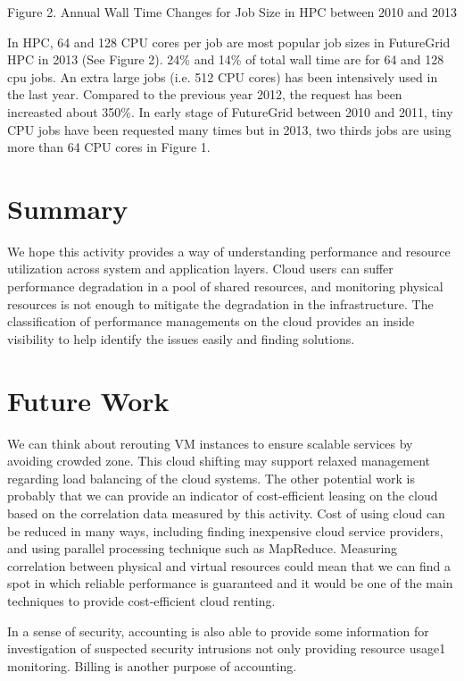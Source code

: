 \documentclass{sig-alternate}
\begin{document}
Figure 2. Annual Wall Time Changes for Job Size in HPC between 2010 and 2013

In HPC, 64 and 128 CPU cores per job are most popular job sizes in FutureGrid HPC in 2013 (See Figure 2). 24\% and 14\% of total wall time are for 64 and 128 cpu jobs. An extra large jobs (i.e. 512 CPU cores) has been intensively used in the last year. Compared to the previous year 2012, the request has been increasted about 350\%. In early stage of FutureGrid between 2010 and 2011, tiny CPU jobs have been requested many times but in 2013, two thirds jobs are using more than 64 CPU cores in Figure 1.
 
\section{Summary}

We hope this activity provides a way of understanding performance and resource utilization across system and application layers. Cloud users can suffer performance degradation in a pool of shared resources, and monitoring physical resources is not enough to mitigate the degradation in the infrastructure. The classification of performance managements on the cloud provides an inside visibility to help identify the issues easily and finding solutions.

\section{Future Work}

We can think about rerouting VM instances to ensure scalable services by avoiding crowded zone. This cloud shifting may support relaxed management regarding load balancing of the cloud systems. The other potential work is probably that we can provide an indicator of cost-efficient leasing on the cloud based on the correlation data measured by this activity. Cost of using cloud can be reduced in many ways, including finding inexpensive cloud service providers, and using parallel processing technique such as MapReduce. Measuring correlation between physical and virtual resources could mean that we can find a spot in which reliable performance is guaranteed and it would be one of the main techniques to provide cost-efficient cloud renting.

In a sense of security, accounting is also able to provide some information for investigation of suspected security intrusions not only providing resource usage1 monitoring. Billing is another purpose of accounting.
\end{document}
